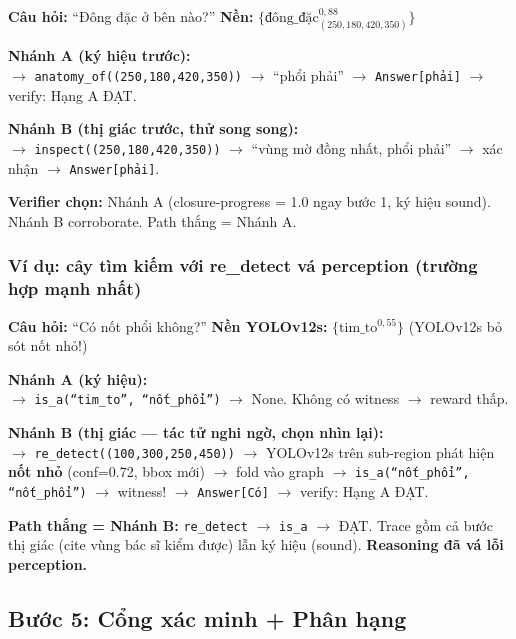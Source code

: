 \documentclass[11pt,a4paper]{article}
\begin{document}
\begin{examplebox}
\small
\textbf{Câu hỏi:} ``Đông đặc ở bên nào?'' \quad \textbf{Nền:} $\{\text{đông\_đặc}^{0{,}88}_{(250,180,420,350)}\}$

\medskip
\textbf{Nhánh A (ký hiệu trước):}\\
$\to$ \texttt{anatomy\_of((250,180,420,350))} $\to$ ``phổi phải'' $\to$ \texttt{Answer[phải]} $\to$ verify: Hạng A ĐẠT.

\medskip
\textbf{Nhánh B (thị giác trước, thử song song):}\\
$\to$ \texttt{inspect((250,180,420,350))} $\to$ ``vùng mờ đồng nhất, phổi phải'' $\to$ xác nhận $\to$ \texttt{Answer[phải]}.

\medskip
\textbf{Verifier chọn:} Nhánh A (closure-progress = 1.0 ngay bước 1, ký hiệu sound). Nhánh B corroborate. Path thắng = Nhánh A.
\end{examplebox}

\subsubsection{Ví dụ: cây tìm kiếm với re\_detect vá perception (trường hợp mạnh nhất)}

\begin{examplebox}
\small
\textbf{Câu hỏi:} ``Có nốt phổi không?'' \quad \textbf{Nền YOLOv12s:} $\{\text{tim\_to}^{0{,}55}\}$ (YOLOv12s bỏ sót nốt nhỏ!)

\medskip
\textbf{Nhánh A (ký hiệu):}\\
$\to$ \texttt{is\_a(``tim\_to'', ``nốt\_phổi'')} $\to$ None. Không có witness $\to$ reward thấp.

\medskip
\textbf{Nhánh B (thị giác --- tác tử nghi ngờ, chọn nhìn lại):}\\
$\to$ \texttt{re\_detect((100,300,250,450))} $\to$ YOLOv12s trên sub-region phát hiện \textbf{nốt nhỏ} (conf=0.72, bbox mới) $\to$ fold vào graph $\to$ \texttt{is\_a(``nốt\_phổi'', ``nốt\_phổi'')} $\to$ witness! $\to$ \texttt{Answer[Có]} $\to$ verify: Hạng A ĐẠT.

\medskip
\textbf{Path thắng = Nhánh B:} \texttt{re\_detect} $\to$ \texttt{is\_a} $\to$ ĐẠT. Trace gồm cả bước thị giác (cite vùng bác sĩ kiểm được) lẫn ký hiệu (sound). \textbf{Reasoning đã vá lỗi perception.}
\end{examplebox}


\subsection{Bước 5: Cổng xác minh + Phân hạng}
\end{document}
